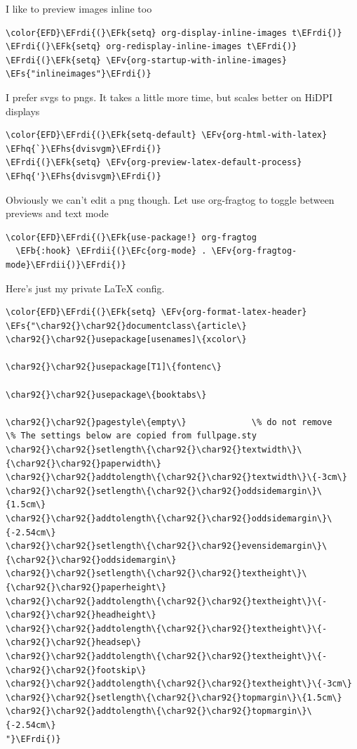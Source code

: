 \documentclass{scrartcl}
\newcommand{\EFk}[1]{\textcolor{EFk}{#1}} %
\newcommand{\EFs}[1]{\textcolor{EFs}{#1}} %
\newcommand{\EFb}[1]{\textcolor{EFb}{#1}} %
\newcommand{\EFc}[1]{\textcolor{EFc}{#1}} %
\newcommand{\EFv}[1]{\textcolor{EFv}{#1}} %
\newcommand{\EFhq}[1]{\textcolor{EFhq}{#1}} %
\newcommand{\EFhs}[1]{\textcolor{EFhs}{#1}} %
\newcommand{\EFrdi}[1]{\textcolor{EFrdi}{#1}} %
\newcommand{\EFrdii}[1]{\textcolor{EFrdii}{#1}} %
\begin{document}
I like to preview images inline too
\begin{Code}
\begin{Verbatim}[]
\color{EFD}\EFrdi{(}\EFk{setq} org-display-inline-images t\EFrdi{)}
\EFrdi{(}\EFk{setq} org-redisplay-inline-images t\EFrdi{)}
\EFrdi{(}\EFk{setq} \EFv{org-startup-with-inline-images} \EFs{"inlineimages"}\EFrdi{)}
\end{Verbatim}
\end{Code}

I prefer svgs to pngs. It takes a little more time, but scales better on HiDPI displays
\begin{Code}
\begin{Verbatim}[]
\color{EFD}\EFrdi{(}\EFk{setq-default} \EFv{org-html-with-latex} \EFhq{`}\EFhs{dvisvgm}\EFrdi{)}
\EFrdi{(}\EFk{setq} \EFv{org-preview-latex-default-process} \EFhq{'}\EFhs{dvisvgm}\EFrdi{)}
\end{Verbatim}
\end{Code}

Obviously we can't edit a png though. Let use org-fragtog to toggle between previews and text mode
\begin{Code}
\begin{Verbatim}[]
\color{EFD}\EFrdi{(}\EFk{use-package!} org-fragtog
  \EFb{:hook} \EFrdii{(}\EFc{org-mode} . \EFv{org-fragtog-mode}\EFrdii{)}\EFrdi{)}
\end{Verbatim}
\end{Code}

Here's just my private \LaTeX{} config.
\begin{Code}
\begin{Verbatim}[]
\color{EFD}\EFrdi{(}\EFk{setq} \EFv{org-format-latex-header} \EFs{"\char92{}\char92{}documentclass\{article\}
\char92{}\char92{}usepackage[usenames]\{xcolor\}

\char92{}\char92{}usepackage[T1]\{fontenc\}

\char92{}\char92{}usepackage\{booktabs\}

\char92{}\char92{}pagestyle\{empty\}             \% do not remove
\% The settings below are copied from fullpage.sty
\char92{}\char92{}setlength\{\char92{}\char92{}textwidth\}\{\char92{}\char92{}paperwidth\}
\char92{}\char92{}addtolength\{\char92{}\char92{}textwidth\}\{-3cm\}
\char92{}\char92{}setlength\{\char92{}\char92{}oddsidemargin\}\{1.5cm\}
\char92{}\char92{}addtolength\{\char92{}\char92{}oddsidemargin\}\{-2.54cm\}
\char92{}\char92{}setlength\{\char92{}\char92{}evensidemargin\}\{\char92{}\char92{}oddsidemargin\}
\char92{}\char92{}setlength\{\char92{}\char92{}textheight\}\{\char92{}\char92{}paperheight\}
\char92{}\char92{}addtolength\{\char92{}\char92{}textheight\}\{-\char92{}\char92{}headheight\}
\char92{}\char92{}addtolength\{\char92{}\char92{}textheight\}\{-\char92{}\char92{}headsep\}
\char92{}\char92{}addtolength\{\char92{}\char92{}textheight\}\{-\char92{}\char92{}footskip\}
\char92{}\char92{}addtolength\{\char92{}\char92{}textheight\}\{-3cm\}
\char92{}\char92{}setlength\{\char92{}\char92{}topmargin\}\{1.5cm\}
\char92{}\char92{}addtolength\{\char92{}\char92{}topmargin\}\{-2.54cm\}
"}\EFrdi{)}
\end{Verbatim}
\end{Code}
\end{document}
